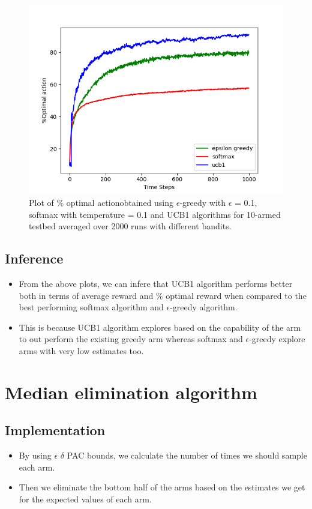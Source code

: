 \documentclass[english]{article}
\begin{document}
\begin{figure}[H]
    \centering
    \includegraphics[width=\linewidth]{ucb1_opt_action_10arms.png}
    \caption{Plot of \% optimal actionobtained using $\epsilon$-greedy with $\epsilon$ = 0.1, softmax with temperature = 0.1 and UCB1 algorithms for 10-armed testbed averaged over 2000 runs with different bandits.}
    \label{fig:eg1}
\end{figure}
\subsection{Inference}
\begin{itemize}
    \item From the above plots, we can infere that UCB1 algorithm performs better both in terms of average reward and \% optimal reward when compared to the best performing softmax algorithm and $\epsilon$-greedy algorithm.
    \item This is because UCB1 algorithm explores based on the capability of the arm to out perform the existing greedy arm whereas softmax and $\epsilon$-greedy explore arms with very low estimates too.
\end{itemize}
\pagebreak

\section{Median elimination algorithm}
\subsection{Implementation}
\begin{itemize}
    \item By using $\epsilon$ $\delta$ PAC bounds, we calculate the number of times we should sample each arm.
    \item Then we eliminate the bottom half of the arms based on the estimates we get for the expected values of each arm.
\end{itemize}
\end{document}
